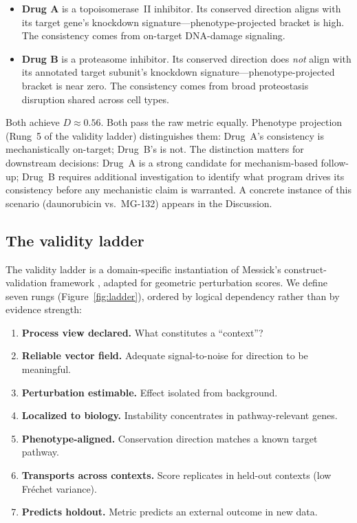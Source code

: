 \documentclass[11pt]{article}
\begin{document}
\begin{itemize}
  \item \textbf{Drug A} is a topoisomerase~II inhibitor. Its conserved
    direction aligns with its target gene's knockdown
    signature---phenotype-projected bracket is high. The consistency comes
    from on-target DNA-damage signaling.
  \item \textbf{Drug B} is a proteasome inhibitor. Its conserved direction
    does \emph{not} align with its annotated target subunit's knockdown
    signature---phenotype-projected bracket is near zero. The consistency
    comes from broad proteostasis disruption shared across cell types.
\end{itemize}

Both achieve $D \approx 0.56$. Both pass the raw metric equally. Phenotype
projection (Rung~5 of the validity ladder) distinguishes them: Drug~A's
consistency is mechanistically on-target; Drug~B's is not. The distinction
matters for downstream decisions: Drug~A is a strong candidate for
mechanism-based follow-up; Drug~B requires additional investigation to
identify what program drives its consistency before any mechanistic claim
is warranted. A concrete instance of this scenario (daunorubicin vs.\
MG-132) appears in the Discussion.

\subsection{The validity ladder}

The validity ladder is a domain-specific instantiation of Messick's
construct-validation framework \citep{messick1995validity}, adapted for
geometric perturbation scores. We define seven rungs
(Figure~\ref{fig:ladder}), ordered by logical dependency rather than by
evidence strength:

\begin{enumerate}
  \item \textbf{Process view declared.} What constitutes a ``context''?
  \item \textbf{Reliable vector field.} Adequate signal-to-noise for
    direction to be meaningful.
  \item \textbf{Perturbation estimable.} Effect isolated from background.
  \item \textbf{Localized to biology.} Instability concentrates in
    pathway-relevant genes.
  \item \textbf{Phenotype-aligned.} Conservation direction matches a
    known target pathway.
  \item \textbf{Transports across contexts.} Score replicates in held-out
    contexts (low Fr\'echet variance).
  \item \textbf{Predicts holdout.} Metric predicts an external outcome
    in new data.
\end{enumerate}
\end{document}
